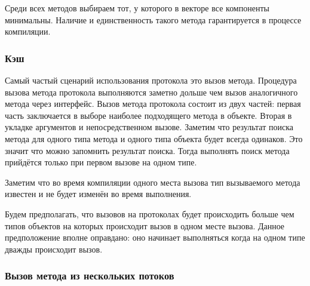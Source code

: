 Среди всех методов выбираем тот, у которого в векторе все компоненты минимальны. Наличие и единственность такого метода гарантируется в процессе компиляции.

\subsubsection{Кэш}
Самый частый сценарий использования протокола это вызов метода. Процедура вызова метода протокола выполняются заметно дольше чем вызов аналогичного метода через интерфейс. Вызов метода протокола состоит из двух частей: первая часть заключается в выборе наиболее подходящего метода в объекте. Вторая в укладке аргументов и непосредственном вызове. Заметим что результат поиска метода для одного типа метода и одного типа объекта будет всегда одинаков. Это значит что можно запомнить результат поиска. Тогда выполнять поиск метода прийдётся только при первом вызове на одном типе.

Заметим что во время компиляции одного места вызова тип вызываемого метода известен и не будет изменён во время выполнения.

Будем предполагать, что вызовов на протоколах будет происходить больше чем типов объектов на которых происходит вызов в одном месте вызова. Данное предположение вполне оправдано: оно начинает выполняться когда на одном типе дважды происходит вызов.

\subsubsection{Вызов метода из нескольких потоков}
